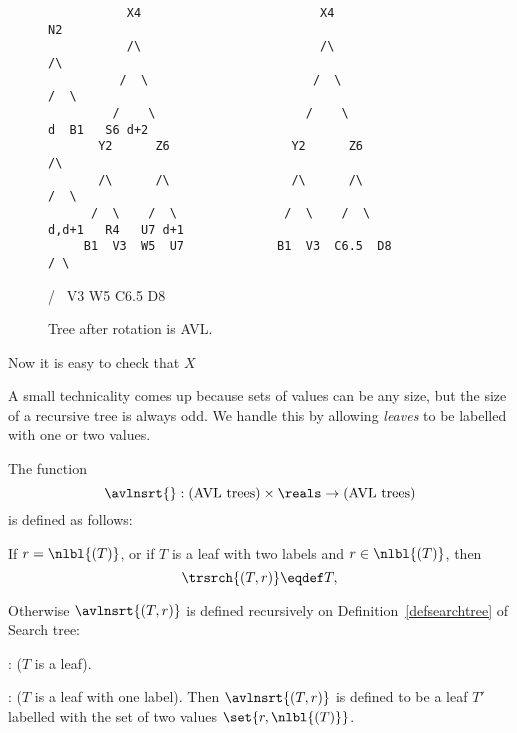 \begin{definition}
\begin{figure}


\begin{verbatim}
           X4                         X4                                     N2                 
           /\                         /\                                     /\                 
          /  \                       /  \                                   /  \                
         /    \                     /    \                              d  B1   S6 d+2
       Y2      Z6                 Y2      Z6                                   /\               
       /\      /\                 /\      /\                                  /  \              
      /  \    /  \               /  \    /  \                       d,d+1   R4   U7 d+1
     B1  V3  W5  U7             B1  V3  C6.5  D8                            / \                 
\end{verbatim}                                                             /   \                
                                                                         V3     W5    C6.5   D8 
\caption{Tree after rotation is AVL.}

\label{rotate2}                                                    
                                                                   
\end{figure}                                                       

Now it is easy to check that $X$ 

A small technicality comes up because sets of values can be any size,
but the size of a recursive tree is always odd.  We handle this by
allowing \emph{leaves} to be labelled with one or two values.

\begin{definition}

The function
\[
\avlnsrt{}: \text{(AVL trees)} \times \reals \to \text{(AVL trees)}
\]
is defined as follows:

If $r = \nlbl{(T)}$, or if $T$ is a leaf with two labels and $r \in
\nlbl{(T)}$, then
\[
\trsrch{(T,r)} \eqdef T,
\]

Otherwise $\avlnsrt{(T,r)}$ is defined recursively on
Definition~\ref{defsearchtree} of Search tree:

\inductioncase{Base case}: ($T$ is a leaf).

: ($T$ is a leaf with one label).  Then
$\avlnsrt{(T,r)}$ is defined to be a leaf $T'$ labelled with the set
of two values $\set{r,\nlbl{(T)}}$.


\end{definition}
\end{definition}
